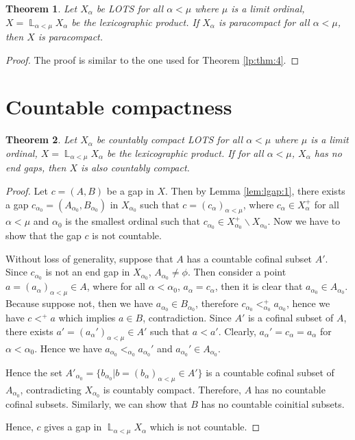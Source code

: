\documentclass[12pt,oneside,english]{amsbook}
\numberwithin{equation}{section} %
\numberwithin{figure}{section} %
\theoremstyle{plain}
\numberwithin{section}{chapter}
\newtheorem{thm}{Theorem}[section]
\theoremstyle{plain}
\DeclareMathOperator{\LP}{\mathbb{L}}
\begin{document}
\begin{thm}\label{lp:thm:5}
  Let $X_{\alpha}$ be LOTS for all $\alpha < \mu$ where $\mu$ is a limit ordinal, $X = \LP_{\alpha < \mu}X_{\alpha}$ be the lexicographic product. If $X_{\alpha}$ is paracompact for all $\alpha < \mu$, then $X$ is paracompact.
\end{thm}
\begin{proof}
 The proof is similar to the one used for Theorem \ref{lp:thm:4}.   
\end{proof}
\section{Countable compactness}
\begin{thm}\label{lp:thm:6}
  Let $X_{\alpha}$ be countably compact LOTS for all $\alpha < \mu$ where $\mu$ is a limit ordinal, $X  =  \LP_{\alpha < \mu} X_{\alpha}$ be the lexicographic product. If for all $\alpha < \mu$, $X_{\alpha}$ has no end gaps, then $X$ is also countably compact.
\end{thm}
\begin{proof}
Let $c = (A,B)$ be a gap in $X$. Then by Lemma \ref{lem:lgap:1}, there exists a gap $c_{\alpha_0} = (A_{\alpha_0},B_{\alpha_0})$ in $X_{\alpha_0}$ such that $c = (c_{\alpha})_{\alpha < \mu}$, where $c_{\alpha} \in X_{\alpha}^+$ for all $\alpha < \mu$ and $\alpha_0$ is the smallest ordinal such that $c_{\alpha_0} \in X_{\alpha_0}^+ \backslash X_{\alpha_0}$. Now we have to show that the gap $c$ is not countable.

Without loss of generality, suppose that $A$ has a countable cofinal subset $A'$. Since $c_{\alpha_{0}}$ is not an end gap in $X_{\alpha_{0}}$, $A_{\alpha_{0}} \neq \phi$. Then consider a point $a  =  (a_{\alpha})_{\alpha < \mu}  \in  A$, where for all $\alpha < \alpha_{0}$, $a_{\alpha}  =  c_{\alpha}$, then it is clear that $a_{\alpha_{0}}  \in  A_{\alpha_{0}}$. Because suppose not, then we have $a_{\alpha_{0}}  \in  B_{\alpha_{0}}$, therefore $c_{\alpha_{0}} <^+_{\alpha_{0}} a_{\alpha_{0}}$, hence we have $c <^+ a$ which implies $a \in B$, contradiction. Since $A'$ is a cofinal subset of $A$, there exists $ a'  =  (a_{\alpha}')_{\alpha < \mu}  \in  A'$ such that $a < a'$. Clearly, $a_{\alpha}' = c_{\alpha} = a_{\alpha}$ for $\alpha < \alpha_0$. Hence we have $a_{\alpha_0} <_{\alpha_0} a_{\alpha_0}'$ and $a_{\alpha_{0}}' \in A_{\alpha_0}$.

  Hence the set $A'_{\alpha_{0}}  =  \{b_{\alpha_{0}} | b = (b_{\alpha})_{\alpha < \mu} \in A' \}$ is a countable cofinal subset of $A_{\alpha_{0}}$, contradicting $X_{\alpha_{0}}$ is countably compact. Therefore, $A$ has no countable cofinal subsets. Similarly, we can show that $B$ has no countable coinitial subsets.

    Hence, $c$ gives a gap in $ \LP_{\alpha < \mu} X_{\alpha}$ which is not countable. 
\end{proof}
\end{document}
